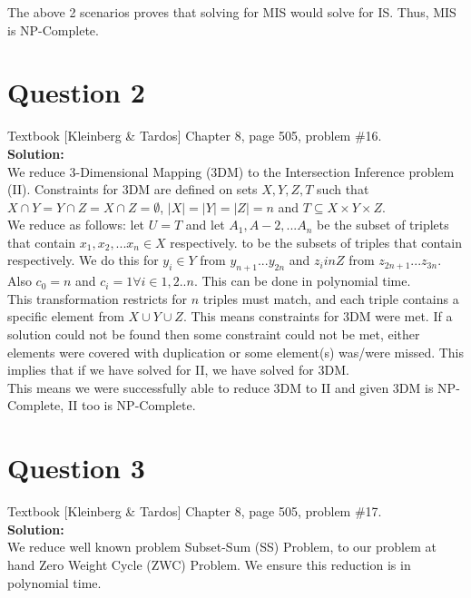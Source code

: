 \documentclass[11pt]{article}
\begin{document}
The above 2 scenarios proves that solving for MIS would solve for IS. Thus, MIS is NP-Complete.

\section{Question 2} Textbook [Kleinberg \& Tardos] Chapter 8, page 505, problem \#16. \\
\textbf{Solution:} \\

We reduce 3-Dimensional Mapping (3DM) to the Intersection Inference problem (II). Constraints for 3DM are defined on sets $ X,Y,Z,T $ such that $ X \cap Y = Y \cap Z = X \cap Z = \emptyset $, $|X|=|Y|=|Z|=n$ and $ T \subseteq X \times Y \times Z $. \\

We reduce as follows: let $ U = T $ and let ${A_1, A-2, ... A_n}$ be the subset of triplets that contain $ x_1, x_2, ... x_n \in X $ respectively. to be the subsets of triples that contain respectively.
We do this for $ y_i \in Y $ from $ y_{n+1} ... y_{2n} $ and $z_i in Z$ from $ z_{2n+1} ... z_{3n} $. Also $ c_0 = n $ and $ c_i = 1 \forall i \in {1,2..n} $. This can be done in polynomial time. \\

This transformation restricts for $ n $ triples must match, and each triple contains a specific element from $ X \cup Y \cup Z $. This means constraints for 3DM were met. If a solution could not be found then some constraint could not be met, either elements were covered with duplication or some element(s) was/were missed. This implies that if we have solved for II, we have solved for 3DM. \\

This means we were successfully able to reduce 3DM to II and given 3DM is NP-Complete, II too is NP-Complete.

\section{Question 3} Textbook [Kleinberg \& Tardos] Chapter 8, page 505, problem \#17. \\
\textbf{Solution:} \\

We reduce well known problem Subset-Sum (SS) Problem, to our problem at hand Zero Weight Cycle (ZWC) Problem. We ensure this reduction is in polynomial time. \\
\end{document}
